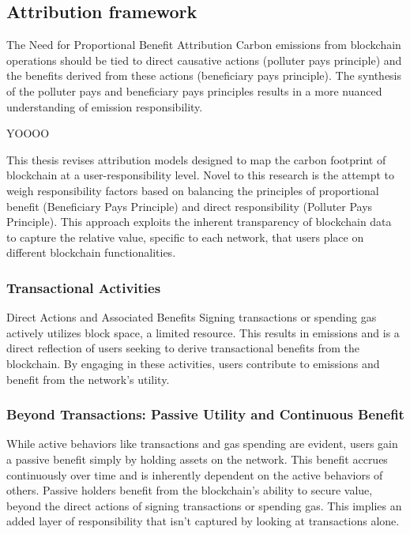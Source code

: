 \documentclass[11pt]{report}
\begin{document}
\subsection{Attribution framework}
The Need for Proportional Benefit Attribution
Carbon emissions from blockchain operations should be tied to direct causative actions (polluter pays principle) and the benefits derived from these actions (beneficiary pays principle). The synthesis of the polluter pays and beneficiary pays principles results in a more nuanced understanding of emission responsibility.

    {\large{YOOOO}}

This thesis revises attribution models designed to map the carbon footprint of blockchain at a user-responsibility level. Novel to this research is the attempt to weigh responsibility factors based on balancing the principles of proportional benefit (Beneficiary Pays Principle) and direct responsibility (Polluter Pays Principle). This approach exploits the inherent transparency of blockchain data to capture the relative value, specific to each network, that users place on different blockchain functionalities.

\subsubsection*{Transactional Activities}

Direct Actions and Associated Benefits
Signing transactions or spending gas actively utilizes block space, a limited resource. This results in emissions and is a direct reflection of users seeking to derive transactional benefits from the blockchain. By engaging in these activities, users contribute to emissions and benefit from the network's utility.

\subsubsection*{Beyond Transactions: Passive Utility and Continuous Benefit}
While active behaviors like transactions and gas spending are evident, users gain a passive benefit simply by holding assets on the network. This benefit accrues continuously over time and is inherently dependent on the active behaviors of others. Passive holders benefit from the blockchain's ability to secure value, beyond the direct actions of signing transactions or spending gas. This implies an added layer of responsibility that isn't captured by looking at transactions alone.
\end{document}
